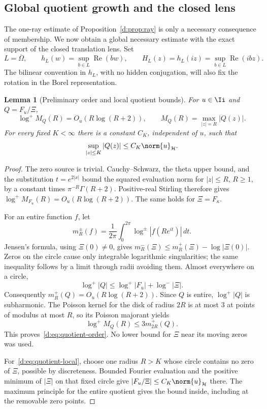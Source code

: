 \documentclass[11pt,a4paper]{article}
\numberwithin{equation}{section}
\newtheorem{lemma}[theorem]{Lemma}
\theoremstyle{definition}\newtheorem{definition}[theorem]{Definition}
\theoremstyle{remark}\newtheorem{remark}[theorem]{Remark}
\newcommand{\Hh}{\mathcal H}\newcommand{\Hw}{\mathcal H}
\begin{document}
\subsection{Global quotient growth and the closed lens}\label{d:sec:global-growth}

The one-ray estimate of Proposition~\ref{d:prop:ray} is only a necessary consequence of membership. We now obtain a global necessary estimate with the exact support of the closed translation lens. Set
\begin{equation}\label{d:eq:closed-lens}
 L=\overline\Omega,\qquad
 h_L(w)=\sup_{b\in L}\operatorname{Re}(bw),\qquad
 H_L(z)=h_L(iz)=\sup_{b\in L}\operatorname{Re}(ibz).
\end{equation}
The bilinear convention in $h_L$, with no hidden conjugation, will also fix the rotation in the Borel representation.

\begin{lemma}[Preliminary order and local quotient bounds]\label{d:lem:quotient-order}
For $u\in\Ii$ and $Q=F_u/\Xi$,
\begin{equation}\label{d:eq:quotient-order}
 \log^+M_Q(R)=O_u(R\log(R+2)),
 \qquad M_Q(R)=\max_{|z|=R}|Q(z)|.
\end{equation}
For every fixed $K<\infty$ there is a constant $C_K$, independent of $u$, such that
\begin{equation}\label{d:eq:quotient-local}
 \sup_{|z|\le K}|Q(z)|\le C_K\norm{u}_{\Hh}.
\end{equation}
\end{lemma}
\begin{proof}
The zero source is trivial. Cauchy--Schwarz, the theta upper bound, and the substitution $t=e^{2|x|}$ bound the squared evaluation norm for $|z|\le R$, $R\ge1$, by a constant times $\pi^{-R}\Gamma(R+2)$. Positive-real Stirling therefore gives
$\log^+M_{F_u}(R)=O_u(R\log(R+2))$. The same holds for $\Xi=F_\kappa$.

For an entire function $f$, let
\[
 m_R^\pm(f)=\frac1{2\pi}\int_0^{2\pi}\log^\pm|f(Re^{it})|\,dt.
\]
Jensen's formula, using $\Xi(0)\ne0$, gives
$m_R^-(\Xi)\le m_R^+(\Xi)-\log|\Xi(0)|$. Zeros on the circle cause only integrable logarithmic singularities; the same inequality follows by a limit through radii avoiding them. Almost everywhere on a circle,
\[
 \log^+|Q|\le\log^+|F_u|+\log^-|\Xi|.
\]
Consequently $m_R^+(Q)=O_u(R\log(R+2))$. Since $Q$ is entire, $\log^+|Q|$ is subharmonic. The Poisson kernel for the disk of radius $2R$ is at most $3$ at points of modulus at most $R$, so its Poisson majorant yields
\[
 \log^+M_Q(R)\le3m_{2R}^+(Q).
\]
This proves~\eqref{d:eq:quotient-order}. No lower bound for $\Xi$ near its moving zeros was used.

For~\eqref{d:eq:quotient-local}, choose one radius $R>K$ whose circle contains no zero of $\Xi$, possible by discreteness. Bounded Fourier evaluation and the positive minimum of $|\Xi|$ on that fixed circle give
$|F_u/\Xi|\le C_K\norm{u}_{\Hh}$ there. The maximum principle for the entire quotient gives the bound inside, including at the removable zero points.
\end{proof}
\end{document}
